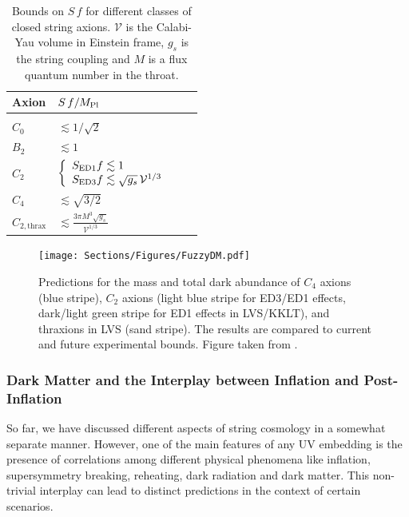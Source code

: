 \begin{table}[t!]
\begin{center}
		\centering
		\begin{tabular}{l | l c | c | }
\hline
		\cellcolor[gray]{0.9}  	Axion &  \cellcolor[gray]{0.9}    $S\,f/M_{\rm Pl}$          \\ [5pt]
			\hline\\ [-5pt]
			$C_0$ 	& $\lesssim 1/\sqrt{2}$      \\ [7pt]
			$B_2$	 & $\lesssim 1$  \\[7pt]
			$C_2$ 	   & $\left\{\begin{array}{ll}
				S_{\rm ED1}f\lesssim 1 \ \\
				S_{\rm ED3}f\lesssim \sqrt{g_s}\,\mathcal{V}^{1/3}
			\end{array}\right.$	  \\[15pt]
			$C_4$ 	    &  $\lesssim \sqrt{3/2}$ 	  \\[5pt]
			$C_{2,\text{thrax}}$ 	    & 
        $\lesssim \frac{3\pi M^3\sqrt{g_s} }{\mathcal{V}^{1/3}}$ \\[6pt]
			\hline
		\end{tabular}
\end{center}
		\caption{Bounds on $S\,f$ for different classes of closed string axions. $\mathcal{V}$ is the Calabi-Yau volume in Einstein frame, $g_s$ is the string coupling and $M$ is a flux quantum number in the throat. \label{tab:closedaxions}}
	\end{table}

\begin{figure}[ht]
    \centering
    \texttt{[image: Sections/Figures/FuzzyDM.pdf]} 
    \caption{Predictions for the mass and total dark abundance of $C_4$ axions (blue stripe), $C_2$ axions (light blue stripe for ED3/ED1 effects, dark/light green stripe for ED1 effects in LVS/KKLT), and thraxions in LVS (sand stripe). The results are compared to current and future experimental bounds. Figure taken from \cite{Cicoli:2021gss}.}
    \label{fig:final_plot_bounds}
\end{figure}





\subsubsection{Dark Matter and the Interplay between Inflation and Post-Inflation}

So far, we have discussed different aspects of string cosmology in a somewhat separate manner. However, one of the main features of any UV embedding is the presence of  correlations among different physical phenomena like inflation, supersymmetry breaking, reheating, dark radiation and dark matter. This non-trivial interplay can lead to distinct predictions in the context of certain scenarios. 

